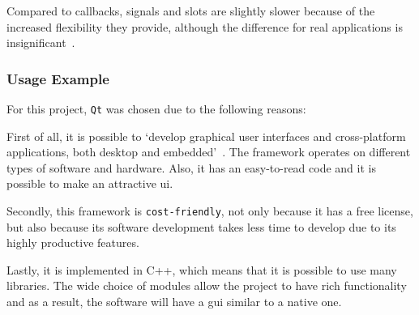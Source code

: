 Compared to callbacks, signals and slots are slightly slower because of the increased flexibility they provide, although the difference for real applications is insignificant~\cite{qt-signals-slots}.

\subsubsection{Usage Example}



For this project, \texttt{Qt} was chosen due to the following reasons:
\begin{item-c}
\item
  First of all, it is possible to `develop graphical user interfaces and cross-platform applications, both desktop and embedded'~\cite{qt-bib}.
The framework operates on different types of software and hardware.
Also, it has an easy-to-read code and it is possible to make an attractive
\gls{ui}.
\item 
Secondly, this framework is \texttt{cost-friendly}, not only because it has a
free license, but also because its software development takes less time to
develop due to its highly productive features.
\item
Lastly, it is implemented in C++, which means that it is possible to use many libraries.
The wide choice of modules allow the project to have rich functionality and as a result, the software will have a \gls{gui} similar to a native one.
\end{item-c}

